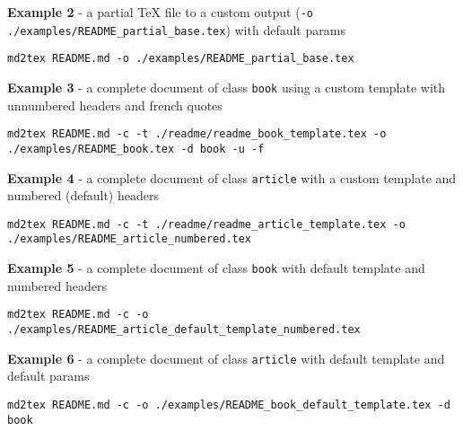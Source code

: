\textbf{Example 2} - a partial TeX file to a custom output (\texttt{-o ./examples/README\_partial\_base.tex}) with default params

\begin{listing}[h!]
   \begin{verbatim}
md2tex README.md -o ./examples/README_partial_base.tex

   \end{verbatim}
\end{listing}

\textbf{Example 3} - a complete document of class \texttt{book} using a custom template with unnumbered headers and french quotes

\begin{listing}[h!]
   \begin{verbatim}
md2tex README.md -c -t ./readme/readme_book_template.tex -o ./examples/README_book.tex -d book -u -f

   \end{verbatim}
\end{listing}

\textbf{Example 4} - a complete document of class \texttt{article} with a custom template and numbered (default) headers

\begin{listing}[h!]
   \begin{verbatim}
md2tex README.md -c -t ./readme/readme_article_template.tex -o ./examples/README_article_numbered.tex

   \end{verbatim}
\end{listing}

\textbf{Example 5} - a complete document of class \texttt{book} with default template and numbered headers

\begin{listing}[h!]
   \begin{verbatim}
md2tex README.md -c -o ./examples/README_article_default_template_numbered.tex

   \end{verbatim}
\end{listing}

\textbf{Example 6} - a complete document of class \texttt{article} with default template and default params

\begin{listing}[h!]
   \begin{verbatim}
md2tex README.md -c -o ./examples/README_book_default_template.tex -d book

   \end{verbatim}
\end{listing}

